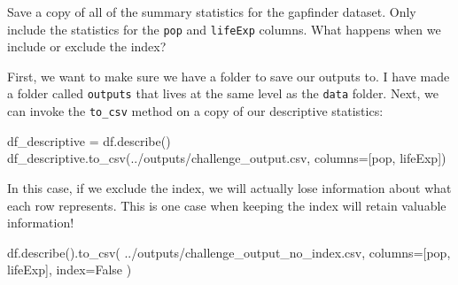 \documentclass[
  letterpaper,
  DIV=11,
  numbers=noendperiod]{scrreprt}
\newenvironment{Shaded}{\begin{snugshade}}{\end{snugshade}}
\newcommand{\NormalTok}[1]{\textcolor[rgb]{0.00,0.23,0.31}{#1}}
\newcommand{\OperatorTok}[1]{\textcolor[rgb]{0.37,0.37,0.37}{#1}}
\newcommand{\StringTok}[1]{\textcolor[rgb]{0.13,0.47,0.30}{#1}}
\newcommand{\VariableTok}[1]{\textcolor[rgb]{0.07,0.07,0.07}{#1}}
\begin{document}
\begin{tcolorbox}[enhanced jigsaw, rightrule=.15mm, opacitybacktitle=0.6, colback=white, toprule=.15mm, colframe=quarto-callout-warning-color-frame, bottomtitle=1mm, bottomrule=.15mm, arc=.35mm, coltitle=black, breakable, title={Challenge 3}, titlerule=0mm, opacityback=0, colbacktitle=quarto-callout-warning-color!10!white, left=2mm, toptitle=1mm, leftrule=.75mm]
Save a copy of all of the summary statistics for the gapfinder dataset.
Only include the statistics for the \texttt{pop} and \texttt{lifeExp}
columns. What happens when we include or exclude the index?
\end{tcolorbox}

\begin{tcolorbox}[enhanced jigsaw, rightrule=.15mm, opacitybacktitle=0.6, colback=white, toprule=.15mm, colframe=quarto-callout-note-color-frame, bottomtitle=1mm, bottomrule=.15mm, arc=.35mm, coltitle=black, breakable, title={Solution to Challenge 3}, titlerule=0mm, opacityback=0, colbacktitle=quarto-callout-note-color!10!white, left=2mm, toptitle=1mm, leftrule=.75mm]

First, we want to make sure we have a folder to save our outputs to. I
have made a folder called \texttt{outputs} that lives at the same level
as the \texttt{data} folder. Next, we can invoke the \texttt{to\_csv}
method on a copy of our descriptive statistics:

\begin{Shaded}
\begin{Highlighting}[]
\NormalTok{df\_descriptive }\OperatorTok{=}\NormalTok{ df.describe()}
\NormalTok{df\_descriptive.to\_csv(}\StringTok{\textquotesingle{}../outputs/challenge\_output.csv\textquotesingle{}}\NormalTok{, columns}\OperatorTok{=}\NormalTok{[}\StringTok{\textquotesingle{}pop\textquotesingle{}}\NormalTok{, }\StringTok{\textquotesingle{}lifeExp\textquotesingle{}}\NormalTok{])}
\end{Highlighting}
\end{Shaded}

In this case, if we exclude the index, we will actually lose information
about what each row represents. This is one case when keeping the index
will retain valuable information!

\begin{Shaded}
\begin{Highlighting}[]
\NormalTok{df.describe().to\_csv(}
    \StringTok{\textquotesingle{}../outputs/challenge\_output\_no\_index.csv\textquotesingle{}}\NormalTok{, }
\NormalTok{    columns}\OperatorTok{=}\NormalTok{[}\StringTok{\textquotesingle{}pop\textquotesingle{}}\NormalTok{, }\StringTok{\textquotesingle{}lifeExp\textquotesingle{}}\NormalTok{],}
\NormalTok{    index}\OperatorTok{=}\VariableTok{False}
\NormalTok{    )}
\end{Highlighting}
\end{Shaded}

\end{tcolorbox}
\end{document}
